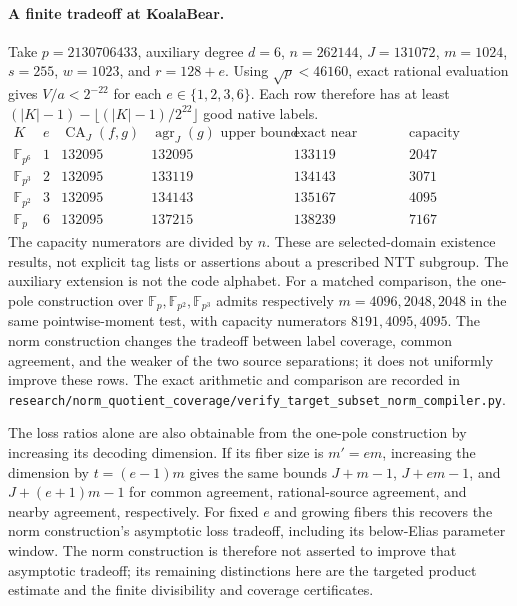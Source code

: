 \paragraph{A finite tradeoff at KoalaBear.}
Take $p=2130706433$, auxiliary degree $d=6$, $n=262144$,
$J=131072$, $m=1024$, $s=255$, $w=1023$, and $r=128+e$.
Using $\sqrt p<46160$, exact rational evaluation gives
$V/a<2^{-22}$ for each $e\in\{1,2,3,6\}$.
Each row therefore has at least
$(|K|-1)-\lfloor(|K|-1)/2^{22}\rfloor$ good native labels.
\[
\begin{array}{c|r|r|r|r|r}
 K&e&\operatorname{CA}_J(f,g)&\operatorname{agr}_J(g)\text{ upper bound}
 &\text{exact near agreement}&\text{capacity numerator}\\\hline
 \mathbb F_{p^6}&1&132095&132095&133119&2047\\
 \mathbb F_{p^3}&2&132095&133119&134143&3071\\
 \mathbb F_{p^2}&3&132095&134143&135167&4095\\
 \mathbb F_p&6&132095&137215&138239&7167
\end{array}
\]
The capacity numerators are divided by $n$.  These are selected-domain
existence results, not explicit tag lists or assertions about a prescribed
NTT subgroup.  The auxiliary extension is not the code alphabet.
For a matched comparison, the one-pole construction over
$\mathbb F_p,\mathbb F_{p^2},\mathbb F_{p^3}$ admits respectively
$m=4096,2048,2048$ in the same pointwise-moment test, with capacity
numerators $8191,4095,4095$.  The norm construction changes the
tradeoff between label coverage, common agreement, and the weaker of
the two source separations; it does not uniformly improve these rows.
The exact arithmetic and comparison are recorded in
\nolinkurl{research/norm_quotient_coverage/verify_target_subset_norm_compiler.py}.


The loss ratios alone are also obtainable from the one-pole construction
by increasing its decoding dimension.  If its fiber size is $m'=em$,
increasing the dimension by $t=(e-1)m$ gives the same bounds
$J+m-1$, $J+em-1$, and $J+(e+1)m-1$ for common agreement,
rational-source agreement, and nearby agreement, respectively.
For fixed $e$ and growing fibers this recovers the norm construction's
asymptotic loss tradeoff, including its below-Elias parameter window.
The norm construction is therefore not asserted to improve that
asymptotic tradeoff; its remaining distinctions here are the targeted
product estimate and the finite divisibility and coverage certificates.
